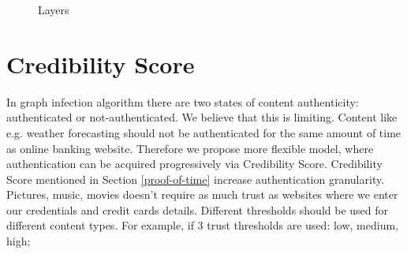 \documentclass[nostrict]{szablonPG}
\begin{document}
\begin{figure}[h!]
 \hfill 	
\caption{Layers}
\label{fig:layers}
\end{figure}


\section{Credibility Score}
In graph infection algorithm there are two states of content authenticity: authenticated or not-authenticated. We believe that this is limiting. Content like e.g. weather forecasting should not be authenticated for the same amount of time as online banking website. Therefore we propose more flexible model, where authentication can be acquired progressively via Credibility Score. Credibility Score mentioned in Section \ref{proof-of-time} increase authentication granularity. Pictures, music, movies doesn't require as much trust as websites where we enter our credentials and credit cards details. Different thresholds should be used for different content types. For example, if 3 trust thresholds are used: low, medium, high;
\end{document}
